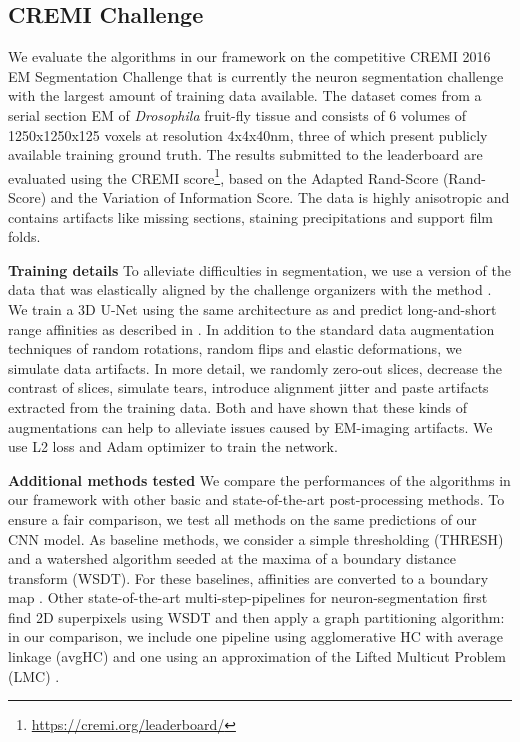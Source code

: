 \subsection{CREMI Challenge} \label{sec:cremi_challenge}
We evaluate the algorithms in our framework on the competitive CREMI 2016 EM Segmentation Challenge \cite{cremiChallenge} that is currently the neuron segmentation challenge with the largest amount of training data available. The dataset comes from a serial section EM of \emph{Drosophila} fruit-fly tissue and consists of 6 volumes of 1250x1250x125 voxels at resolution 4x4x40nm, three of which present publicly available training ground truth. The results submitted to the leaderboard are evaluated using the CREMI score\footnote{\url{https://cremi.org/leaderboard/}}, based on the Adapted Rand-Score (Rand-Score) and the Variation of Information Score\cite{arganda2015crowdsourcing}. The data is highly anisotropic and contains artifacts like missing sections, staining precipitations and support film folds. 

\textbf{Training details}
To alleviate difficulties in segmentation, we use a version of the data that was elastically aligned by the challenge organizers with the method \cite{saalfeld2012elastic}.
We train a 3D U-Net \cite{ronneberger2015u, cciccek20163d} using the same architecture as \cite{funke2018large} and predict long-and-short range affinities 
as described in \cite{lee2017superhuman}. In addition to the standard data augmentation techniques of random rotations, random flips and elastic deformations, we simulate data artifacts.
In more detail, we randomly zero-out slices, decrease the contrast of slices, simulate tears, introduce alignment jitter and paste artifacts extracted from the training data. Both \cite{funke2018large} and \cite{lee2017superhuman} have shown
that these kinds of augmentations can help to alleviate issues caused by EM-imaging artifacts.
We use L2 loss and Adam optimizer to train the network.

\textbf{Additional methods tested }  We compare the performances of the algorithms in our framework with other basic and state-of-the-art post-processing methods. To ensure a fair comparison, we test all methods on the same predictions of our CNN model. As baseline methods, we consider a simple thresholding (THRESH) and a watershed algorithm seeded at the maxima of a boundary distance transform (WSDT). For these baselines, affinities are converted to a boundary map . Other state-of-the-art multi-step-pipelines for neuron-segmentation first find 2D superpixels using WSDT and then apply a graph partitioning algorithm: in our comparison, we include one pipeline using agglomerative HC with average linkage (avgHC) and one using an approximation of the Lifted Multicut Problem (LMC) \cite{beier2016efficient}.


